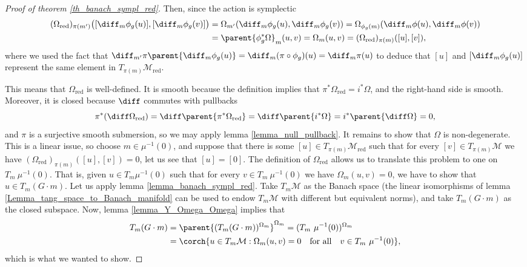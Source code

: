 \begin{proof}[\textit{Proof of theorem} \ref{th_banach_sympl_red}]
    Then, since the action is symplectic
    \begin{align*}
        (\Omega_{\mathrm{red}})_{\pi(m')}\big([\diff_m \phi_g(u)], [\diff_m \phi_g(v)]\big) & = \Omega_{m'}(\diff_m \phi_g(u),\diff_m\phi_g(v))=\Omega_{\phi_g(m)}(\diff_m \phi (u), \diff_m\phi(v))\\
        &=\parent{\phi_g^*\Omega}_m(u,v) = \Omega_m(u,v)  = (\Omega_{\mathrm{red}})_{\pi(m)}([u], [v]),
    \end{align*}
    where we used the fact that \(\diff_{m'} \pi\parent{\diff_m\phi_g(u)}=\diff_m(\pi \circ \phi_g)(u)=\diff_m\pi(u)\) to deduce that \([u]\) and \([\diff_m\phi_g(u)]\) represent the same element in \(T_{\pi(m)}\mathcal{M}_{\mathrm{red}}\). 
    
    This means that \(\Omega_{\mathrm{red}}\) is well-defined. It is smooth because the definition implies that \(\pi^*\Omega_{\mathrm{red}}=i^*\Omega\), and the right-hand side is smooth. Moreover, it is closed because \(\diff\) commutes with pullbacks
    \[
    \pi^*(\diff \Omega_{\mathrm{red}})=\diff\parent{\pi^*\Omega_\mathrm{red}}=\diff\parent{i^*\Omega}=i^*\parent{\diff \Omega}=0,
    \]
    and \(\pi\) is a surjective smooth submersion, so we may apply lemma \ref{lemma_null_pullback}. It remains to show that \(\Omega\) is non-degenerate. This is a linear issue, so choose \(m \in \mu^{-1}(0)\), and suppose that there is some \([u]\in T_{\pi(m)} \mathcal{M}_{\mathrm{red}}\) such that for every \([v]\in T_{\pi(m)}\mathcal{M}\) we have \((\Omega_{\mathrm{red}})_{\pi(m)}([u], [v])=0\), let us see that \([u]=[0]\). The definition of \(\Omega_{\mathrm{red}}\) allows us to translate this problem to one on \(T_m \ \mu^{-1}(0)\). That is, given \(u \in T_m\mu^{-1}(0)\) such that for every \(v \in T_m\ \mu^{-1}(0)\) we have \(\Omega_m(u,v)=0\), we have to show that \(u \in T_m(G \cdot m)\). Let us apply lemma \ref{lemma_banach_sympl_red}. Take \(T_m\mathcal{M}\) as the Banach space (the linear isomorphisms of lemma \ref{Lemma_tang_space_to_Banach_manifold} can be used to endow \(T_m\mathcal{M}\) with different but equivalent norms), and take \(T_m(G \cdot m)\) as the closed subspace. Now, lemma \ref{lemma_Y_Omega_Omega} implies that 
    \begin{align*}
    T_m(G\cdot m)&=\parent{(T_m(G \cdot m))^{\Omega_m}}^{\Omega_m}=(T_m \ \mu^{-1}(0))^{\Omega_m}\\
    &=\corch{u \in T_m\mathcal{M}: \Omega_m(u,v)=0 \ \ \text{ for all }\ \ v \in T_m \ \mu^{-1}(0)},
    \end{align*}
    which is what we wanted to show.
\end{proof}

